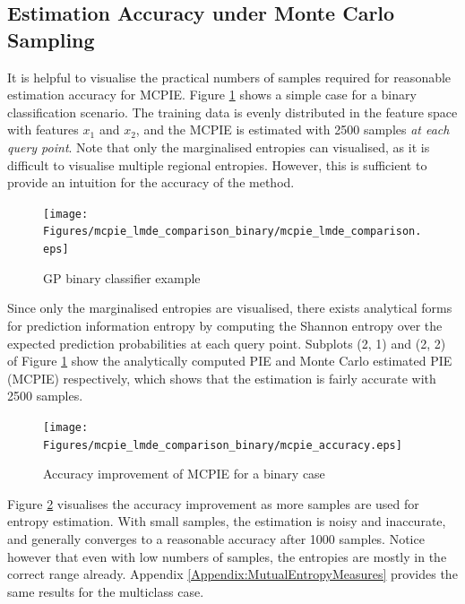 		\subsection{Estimation Accuracy under Monte Carlo Sampling}
		\label{InformativeSeafloorExploration:ComparisonMutualEntropyMeasures:EstimationAccuracy}
		
			It is helpful to visualise the practical numbers of samples required for reasonable estimation accuracy for MCPIE. Figure \ref{Figure:mcpie_lmde_comparison_binary} shows a simple case for a binary classification scenario. The training data is evenly distributed in the feature space with features $x_{1}$ and $x_{2}$, and the MCPIE is estimated with 2500 samples \textit{at each query point}. Note that only the marginalised entropies can visualised, as it is difficult to visualise multiple regional entropies. However, this is sufficient to provide an intuition for the accuracy of the method.
			
			\begin{figure}[!htbp]
				\centering
					\texttt{[image: Figures/mcpie\_lmde\_comparison\_binary/mcpie\_lmde\_comparison.eps]}
				\caption{GP binary classifier example}
				\label{Figure:mcpie_lmde_comparison_binary}
			\end{figure}			
					
			Since only the marginalised entropies are visualised, there exists analytical forms for prediction information entropy by computing the Shannon entropy over the expected prediction probabilities at each query point. Subplots (2, 1) and (2, 2) of Figure \ref{Figure:mcpie_lmde_comparison_binary} show the analytically computed PIE and Monte Carlo estimated PIE (MCPIE) respectively, which shows that the estimation is fairly accurate with 2500 samples.
			
			\begin{figure}[!htbp]
				\centering
					\texttt{[image: Figures/mcpie\_lmde\_comparison\_binary/mcpie\_accuracy.eps]}
				\caption{Accuracy improvement of MCPIE for a binary case}
				\label{Figure:mcpie_accuracy_binary}
			\end{figure}
				
			Figure \ref{Figure:mcpie_accuracy_binary} visualises the accuracy improvement as more samples are used for entropy estimation. With small samples, the estimation is noisy and inaccurate, and generally converges to a reasonable accuracy after 1000 samples. Notice however that even with low numbers of samples, the entropies are mostly in the correct range already. Appendix \ref{Appendix:MutualEntropyMeasures} provides the same results for the multiclass case.
			
